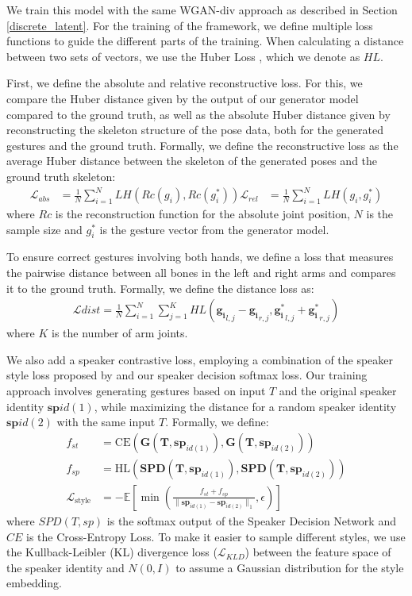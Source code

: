 \documentclass[sigconf]{acmart}
\begin{document}
We train this model with the same WGAN-div approach as described in Section \ref{discrete_latent}.
For the training of the framework, we define multiple loss functions to guide the different parts of the training. When calculating a distance between two sets of vectors, we use the Huber Loss \cite{huberRobustEstimationLocation1964}, which we denote as $HL$. 

First, we define the absolute and relative reconstructive loss. For this, we compare the Huber distance given by the output of our generator model compared to the ground truth, as well as the absolute Huber distance given by reconstructing the skeleton structure of the pose data, both for the generated gestures and the ground truth. Formally, we define the reconstructive loss as the average Huber distance between the skeleton of the generated poses and the ground truth skeleton:
\begin{align}
    \mathcal{L}_{abs} &= \frac{1}{N} \sum^N_{i=1} LH(Rc(g_i),Rc(g^*_i))
    \mathcal{L}_{rel} &= \frac{1}{N} \sum^N_{i=1} LH(g_i,g^*_i)
\end{align}
where $Rc$ is the reconstruction function for the absolute joint position, $N$ is the sample size and $g^*_i$ is the gesture vector from the generator model. 

To ensure correct gestures involving both hands, we define a loss that measures the pairwise distance between all bones in the left and right arms and compares it to the ground truth. Formally, we define the distance loss as:
\begin{align}
\mathcal{L}{dist} = \frac{1}{N}\sum_{i=1}^N\sum_{j=1}^{K}HL(\mathbf{g_i}_{l,j}-\mathbf{g_i}_{r,j},\mathbf{g^*_i}_{l,j}+\mathbf{g^*_i}_{r,j})
\end{align}
where $K$ is the number of arm joints.

We also add a speaker contrastive loss, employing a combination of the speaker style loss proposed by \citet{yoonSpeechGestureGeneration2020} and our speaker decision softmax loss. Our training approach involves generating gestures based on input $T$ and the original speaker identity $\bm{sp}{id(1)}$, while maximizing the distance for a random speaker identity $\bm{sp}{id(2)}$ with the same input $T$. Formally, we define:
\begin{align}
    f_{st} &= \mathrm{CE}(\mathbf{G}(\bm{T},\bm{sp}_{id(1)}),\mathbf{G}(\bm{T},\bm{sp}_{id(2)})) \\
    f_{sp} &= \mathrm{HL}(\mathbf{SPD}(\bm{T},\bm{sp}_{id(1)}),\mathbf{SPD}(\bm{T},\bm{sp}_{id(2)})) \\
    \mathcal{L}_{\mathrm{style}} &= -\mathbb{E}\left[\min \left(\frac{f_{st} + f_{sp}}{\|\bm{sp}_{id(1)} - \bm{sp}_{id(2)}\|_1}, \epsilon\right)\right]
\end{align}
where $SPD(T,sp)$ is the softmax output of the Speaker Decision Network and $CE$ is the Cross-Entropy Loss. To make it easier to sample different styles, we use the Kullback-Leibler (KL) divergence loss ($\mathcal{L}_{KLD}$) between the feature space of the speaker identity and $N(0,I)$ to assume a Gaussian distribution for the style embedding.
\end{document}
